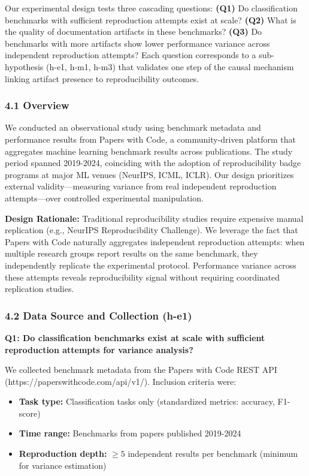 
Our experimental design tests three cascading questions: \textbf{(Q1)} Do classification benchmarks with sufficient reproduction attempts exist at scale? \textbf{(Q2)} What is the quality of documentation artifacts in these benchmarks? \textbf{(Q3)} Do benchmarks with more artifacts show lower performance variance across independent reproduction attempts? Each question corresponds to a sub-hypothesis (h-e1, h-m1, h-m3) that validates one step of the causal mechanism linking artifact presence to reproducibility outcomes.

\subsubsection{4.1 Overview}

We conducted an observational study using benchmark metadata and performance results from Papers with Code, a community-driven platform that aggregates machine learning benchmark results across publications. The study period spanned 2019-2024, coinciding with the adoption of reproducibility badge programs at major ML venues (NeurIPS, ICML, ICLR). Our design prioritizes external validity---measuring variance from real independent reproduction attempts---over controlled experimental manipulation.

\textbf{Design Rationale:} Traditional reproducibility studies require expensive manual replication (e.g., NeurIPS Reproducibility Challenge). We leverage the fact that Papers with Code naturally aggregates independent reproduction attempts: when multiple research groups report results on the same benchmark, they independently replicate the experimental protocol. Performance variance across these attempts reveals reproducibility signal without requiring coordinated replication studies.

\subsubsection{4.2 Data Source and Collection (h-e1)}

\textbf{Q1: Do classification benchmarks exist at scale with sufficient reproduction attempts for variance analysis?}

We collected benchmark metadata from the Papers with Code REST API (https://paperswithcode.com/api/v1/). Inclusion criteria were:
\begin{itemize}
\item \textbf{Task type:} Classification tasks only (standardized metrics: accuracy, F1-score)
\item \textbf{Time range:} Benchmarks from papers published 2019-2024
\item \textbf{Reproduction depth:} $\geq 5$ independent results per benchmark (minimum for variance estimation)
\end{itemize}

